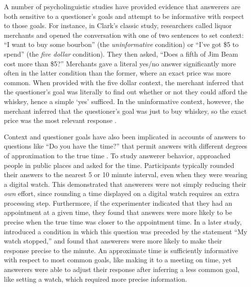 \documentclass[12pt, floatsintext, jou]{apa6}
\begin{document}
A number of psycholinguistic studies have provided evidence that answerers are both sensitive to a questioner's goals and attempt to be informative with respect to those goals.
For instance, in Clark's \citeyear{Clark79_IndirectSpeechActs} classic study, researchers called liquor merchants and opened the conversation with one of two sentences to set context: ``I want to buy some bourbon'' (the \emph{uninformative} condition) or ``I've got \$5 to spend'' (the \emph{five dollar} condition). They then asked, ``Does a fifth of Jim Beam cost more than \$5?'' Merchants gave a literal yes/no answer significantly more often in the latter condition than the former, where an exact price was more common. 
When provided with the five dollar context, the merchant inferred that the questioner's goal was literally to find out whether or not they could afford the whiskey, hence a simple `yes'  sufficed. 
In the uninformative context, however, the merchant inferred that the questioner's goal was just to buy whiskey, so the exact price was the most relevant response \cite{Clark79_IndirectSpeechActs}. 

Context and questioner goals have also been implicated in accounts of answers to questions like ``Do you have the time?'' that permit answers with different degrees of approximation to the true time \cite{DerHenstCarlesSperber02_RelevanceTellingTime, GibbsBryant08_OptimalRelevance}. To study answerer behavior,  approached people in public places and asked for the time. Participants typically rounded their answers to the nearest 5 or 10 minute interval, even when they were wearing a digital watch. This demonstrated that answerers were not simply reducing their \emph{own} effort, since rounding a time displayed on a digital watch requires an extra processing step. Furthermore, if the experimenter indicated that they had an appointment at a given time, they found that answers were more likely to be precise when the true time was closer to the appointment time.  In a later study,  introduced a condition in which this question was preceded by the statement ``My watch stopped,'' and found that answerers were more likely to make their response precise to the minute. An approximate time is sufficiently informative with respect to most common goals, like making it to a meeting on time, yet answerers were able to adjust their response after inferring a less common goal, like setting a watch, which required more precise information.
\end{document}

